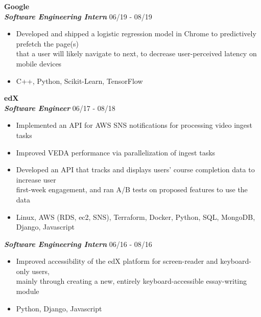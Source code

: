 \documentclass{res}
\begin{document}
\begin{resume}
\textbf{\large{Google}} 
\vspace{1mm} \\
\textbf{\textit{Software Engineering Intern}} \hfill 06/19 - 08/19 \\
	\begin{itemize}   \itemsep -1pt %
	\item Developed and shipped a logistic regression model in Chrome to predictively prefetch the page(s) \\
	that a user will likely navigate to next, to decrease user-perceived latency on mobile devices
	\item C++, Python, Scikit-Learn, TensorFlow
	\end{itemize}
\vspace{3mm}

\textbf{\large{edX}}
\vspace{1mm} \\
\textbf{\textit{Software Engineer}} \hfill 06/17 - 08/18 \\ 
	\begin{itemize}  \itemsep -1pt %
	\item Implemented an API for AWS SNS notifications for processing video ingest tasks
	\item Improved VEDA performance via parallelization of ingest tasks
	\item Developed an API that tracks and displays users' course completion data to increase user \\
		first-week engagement, and ran A/B tests on proposed features to use the data 
	\item Linux, AWS (RDS, ec2, SNS), Terraform, Docker, Python, SQL, MongoDB, Django, Javascript
	\end{itemize}
\textbf{\textit{Software Engineering Intern}} \hfill 06/16 - 08/16 \\
	\begin{itemize}  \itemsep -1pt %
	\item Improved accessibility of the edX platform for screen-reader and keyboard-only users, \\
		mainly through creating a new, entirely keyboard-accessible essay-writing module
	\item Python, Django, Javascript
	\end{itemize}
\vspace{3mm}


\end{resume}
\end{document}
